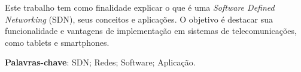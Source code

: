 \setlength{\absparsep}{18pt}
\begin{resumo}

    Este trabalho tem como finalidade explicar o que é uma \textit{Software Defined Networking} (SDN), seus conceitos e
    aplicações. O objetivo é destacar sua funcionalidade e vantagens de implementação em sistemas de telecomunicações,
    como tablets e smartphones.

    \textbf{Palavras-chave}: SDN; Redes; Software; Aplicação.
\end{resumo}